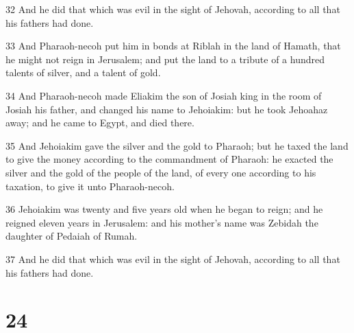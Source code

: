 \par 32 And he did that which was evil in the sight of Jehovah, according to all that his fathers had done.
\par 33 And Pharaoh-necoh put him in bonds at Riblah in the land of Hamath, that he might not reign in Jerusalem; and put the land to a tribute of a hundred talents of silver, and a talent of gold.
\par 34 And Pharaoh-necoh made Eliakim the son of Josiah king in the room of Josiah his father, and changed his name to Jehoiakim: but he took Jehoahaz away; and he came to Egypt, and died there.
\par 35 And Jehoiakim gave the silver and the gold to Pharaoh; but he taxed the land to give the money according to the commandment of Pharaoh: he exacted the silver and the gold of the people of the land, of every one according to his taxation, to give it unto Pharaoh-necoh.
\par 36 Jehoiakim was twenty and five years old when he began to reign; and he reigned eleven years in Jerusalem: and his mother's name was Zebidah the daughter of Pedaiah of Rumah.
\par 37 And he did that which was evil in the sight of Jehovah, according to all that his fathers had done.

\chapter{24}

